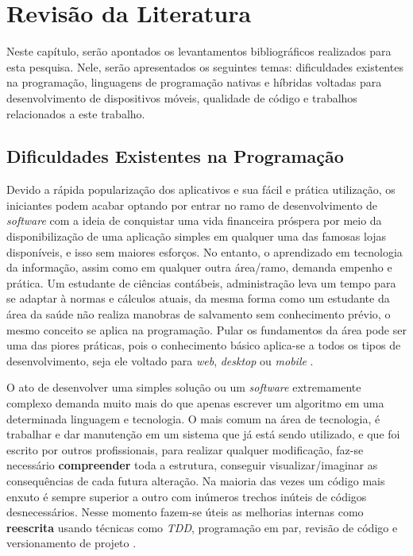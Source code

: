 \chapter{Revisão da Literatura}
\label{cap:02}
Neste capítulo, serão apontados os levantamentos bibliográficos realizados para esta pesquisa. Nele, serão apresentados os seguintes temas: dificuldades existentes na programação, linguagens de programação nativas e híbridas voltadas para desenvolvimento de dispositivos móveis, qualidade de código e trabalhos relacionados a este trabalho.

\section{Dificuldades Existentes na Programação}

Devido a rápida popularização dos aplicativos e sua fácil e prática utilização, os iniciantes podem acabar optando por entrar no ramo de desenvolvimento de \textit{software} com a ideia de conquistar uma vida financeira próspera por meio da disponibilização de uma aplicação simples em qualquer uma das famosas lojas disponíveis, e isso sem maiores esforços. No entanto, o aprendizado em tecnologia da informação, assim como em qualquer outra área/ramo, demanda empenho e prática. Um estudante de ciências contábeis, administração leva um tempo para se adaptar à normas e cálculos atuais, da mesma forma como um estudante da área da saúde não realiza manobras de salvamento sem conhecimento prévio, o mesmo conceito se aplica na programação.
Pular os fundamentos da área pode ser uma das piores práticas, pois o conhecimento básico aplica-se a todos os tipos de desenvolvimento, seja ele voltado para \textit{web}, \textit{desktop} ou \textit{mobile} \cite{Unipe2018}. 

O ato de desenvolver uma simples solução ou um \textit{software} extremamente complexo demanda muito mais do que apenas escrever um algoritmo em uma determinada linguagem e tecnologia.
O mais comum na área de tecnologia, é trabalhar e dar manutenção em um sistema que já está sendo utilizado, e que foi escrito por outros profissionais, para realizar qualquer modificação, faz-se necessário \textbf{compreender} toda a estrutura, conseguir visualizar/imaginar as consequências de cada futura alteração. Na maioria das vezes um código mais enxuto é sempre superior a outro com inúmeros trechos inúteis de códigos desnecessários. Nesse momento fazem-se úteis as melhorias internas como \textbf{reescrita} usando técnicas como \textit{TDD}, programação em par, revisão de código e versionamento de projeto \cite{Gabs2018EscreverCodigo}.

